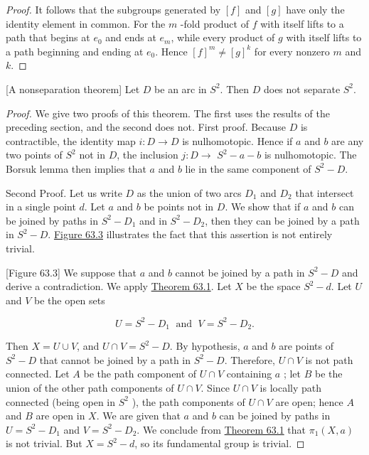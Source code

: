 \begin{proof}
It follows that the subgroups generated by \([ f]\) and \([ g]\) have only the identity element in common. For the \(m\) -fold product of \(f\) with itself lifts to a path that begins at \(e_{0}\) and ends at \(e_{m}\), while every product of \(g\) with itself lifts to a path beginning and ending at \(e_{0}\). Hence \({[ f] }^{m} \neq {[ g] }^{k}\) for every nonzero \(m\) and \(k\).
\end{proof}
\begin{theorem}
\label{thm:\thetheorem}[A nonseparation theorem]
Let \(D\) be an arc in \(S^{2}\). Then \(D\) does not separate \(S^{2}\).
\end{theorem}

\begin{proof}
We give two proofs of this theorem. The first uses the results of the preceding section, and the second does not.
First proof. Because \(D\) is contractible, the identity map \(i : D \rightarrow D\) is nulhomotopic. Hence if \(a\) and \(b\) are any two points of \(S^{2}\) not in \(D\), the inclusion \(j : D \rightarrow\) \(S^{2} - a - b\) is nulhomotopic. The Borsuk lemma then implies that \(a\) and \(b\) lie in the same component of \(S^{2} - D\).

Second Proof. Let us write \(D\) as the union of two arcs \(D_{1}\) and \(D_{2}\) that intersect in a single point \(d\). Let \(a\) and \(b\) be points not in \(D\). We show that if \(a\) and \(b\) can be joined by paths in \(S^{2} - D_{1}\) and in \(S^{2} - D_{2}\), then they can be joined by a path in \(S^{2} - D\). \hyperref[fig:63.3]{Figure 63.3} illustrates the fact that this assertion is not entirely trivial.

[Figure 63.3]
We suppose that \(a\) and \(b\) cannot be joined by a path in \(S^{2} - D\) and derive a contradiction. We apply \hyperref[thm:63.1]{Theorem 63.1}. Let \(X\) be the space \(S^{2} - d\). Let \(U\) and \(V\) be the open sets

\[
U = S^{2} - D_{1}\;\text{ and }\;V = S^{2} - D_{2}.
\]

Then \(X = U \cup V\), and \(U \cap V = S^{2} - D\). By hypothesis, \(a\) and \(b\) are points of \(S^{2} - D\) that cannot be joined by a path in \(S^{2} - D\). Therefore, \(U \cap V\) is not path connected. Let \(A\) be the path component of \(U \cap V\) containing \(a\) ; let \(B\) be the union of the other path components of \(U \cap V\). Since \(U \cap V\) is locally path connected (being open in \(S^{2}\) ), the path components of \(U \cap V\) are open; hence \(A\) and \(B\) are open in \(X\). We are given that \(a\) and \(b\) can be joined by paths in \(U = S^{2} - D_{1}\) and \(V = S^{2} - D_{2}\). We conclude from \hyperref[thm:63.1]{Theorem 63.1} that \({\pi }_{1}( {X,a})\) is not trivial. But \(X = S^{2} - d\), so its fundamental group is trivial.


\end{proof}
